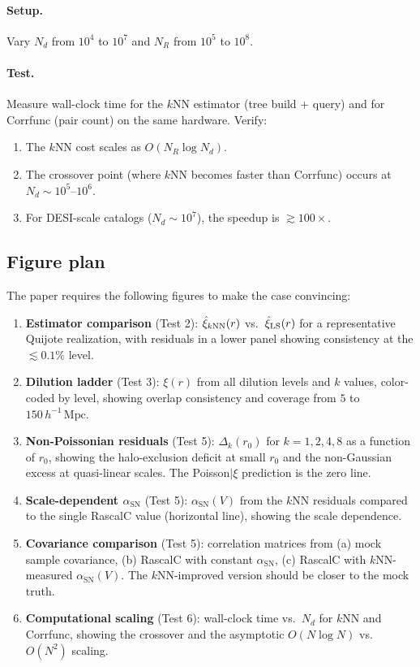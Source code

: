 \paragraph{Setup.}  Vary $N_d$ from $10^4$ to $10^7$ and $N_R$ from $10^5$ to $10^8$.

\paragraph{Test.}  Measure wall-clock time for the $k$NN estimator (tree build + query) and for Corrfunc (pair count) on the same hardware.  Verify:
\begin{enumerate}[nosep]
  \item The $k$NN cost scales as $O(N_R \log N_d)$.
  \item The crossover point (where $k$NN becomes faster than Corrfunc) occurs at $N_d \sim 10^5$--$10^6$.
  \item For DESI-scale catalogs ($N_d \sim 10^7$), the speedup is $\gtrsim 100\times$.
\end{enumerate}

\subsection{Figure plan}
\label{sec:figures}

The paper requires the following figures to make the case convincing:

\begin{enumerate}[nosep]
  \item \textbf{Estimator comparison} (Test 2): $\hat{\xi}_{k\mathrm{NN}}(r)$ vs.\ $\hat{\xi}_{\mathrm{LS}}(r)$ for a representative Quijote realization, with residuals in a lower panel showing consistency at the $\lesssim 0.1\%$ level.
  \item \textbf{Dilution ladder} (Test 3): $\xi(r)$ from all dilution levels and $k$ values, color-coded by level, showing overlap consistency and coverage from $5$ to $150\,h^{-1}\,\mathrm{Mpc}$.
  \item \textbf{Non-Poissonian residuals} (Test 5): $\Delta_k(r_0)$ for $k = 1, 2, 4, 8$ as a function of $r_0$, showing the halo-exclusion deficit at small $r_0$ and the non-Gaussian excess at quasi-linear scales.  The Poisson$|\xi$ prediction is the zero line.
  \item \textbf{Scale-dependent $\alpha_{\mathrm{SN}}$} (Test 5): $\alpha_{\mathrm{SN}}(V)$ from the $k$NN residuals compared to the single RascalC value (horizontal line), showing the scale dependence.
  \item \textbf{Covariance comparison} (Test 5): correlation matrices from (a) mock sample covariance, (b) RascalC with constant $\alpha_{\mathrm{SN}}$, (c) RascalC with $k$NN-measured $\alpha_{\mathrm{SN}}(V)$.  The $k$NN-improved version should be closer to the mock truth.
  \item \textbf{Computational scaling} (Test 6): wall-clock time vs.\ $N_d$ for $k$NN and Corrfunc, showing the crossover and the asymptotic $O(N \log N)$ vs.\ $O(N^2)$ scaling.
\end{enumerate}

